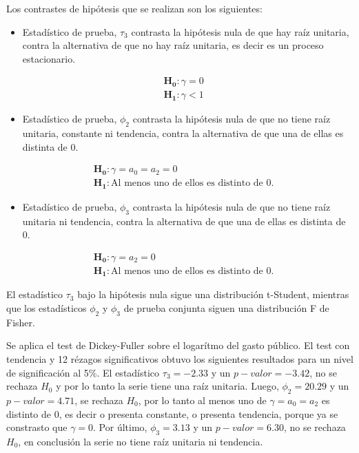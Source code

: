 \documentclass[
  12pt,
]{article}
\providecommand{\tightlist}{%
  \setlength{\itemsep}{0pt}\setlength{\parskip}{0pt}}
\begin{document}
Los contrastes de hipótesis que se realizan son los siguientes:

\begin{itemize}
\tightlist
\item
  Estadístico de prueba, \(\tau_3\) contrasta la hipótesis nula de que
  hay raíz unitaria, contra la alternativa de que no hay raíz unitaria,
  es decir es un proceso estacionario.
\end{itemize}

\begin{align*}
& \mathbf{H_0} : \gamma = 0 \\
& \mathbf{H_1} : \gamma < 1
\end{align*}

\begin{itemize}
\tightlist
\item
  Estadístico de prueba, \(\phi_2\) contrasta la hipótesis nula de que
  no tiene raíz unitaria, constante ni tendencia, contra la alternativa
  de que una de ellas es distinta de 0.
\end{itemize}

\begin{align*}
& \mathbf{H_0} : \gamma = a_0 = a_2 = 0 \\
& \mathbf{H_1} : \text{Al menos uno de ellos es distinto de 0.}
\end{align*}

\begin{itemize}
\tightlist
\item
  Estadístico de prueba, \(\phi_3\) contrasta la hipótesis nula de que
  no tiene raíz unitaria ni tendencia, contra la alternativa de que una
  de ellas es distinta de 0.
\end{itemize}

\begin{align*}
& \mathbf{H_0} : \gamma = a_2 = 0 \\
& \mathbf{H_1} : \text{Al menos uno de ellos es distinto de 0.}
\end{align*}

El estadístico \(\tau_3\) bajo la hipótesis nula sigue una distribución
t-Student, mientras que los estadísticos \(\phi_2\) y \(\phi_3\) de
prueba conjunta siguen una distribución F de Fisher.

Se aplica el test de Dickey-Fuller sobre el logarítmo del gasto público.
El test con tendencia y 12 rézagos significativos obtuvo los siguientes
resultados para un nivel de significación al 5\%. El estadístico \(
\tau_3 = -2.33\) y un \(p-valor=-3.42\), no se rechaza \(H_0\) y
por lo tanto la serie tiene una raíz unitaria. Luego, \(\phi_2 = 20.29\)
y un \(p-valor=4.71\), se rechaza \(H_0\), por lo tanto al menos uno de
\(\gamma = a_0 = a_2\) es distinto de 0, es decir o presenta
constante, o presenta tendencia, porque ya se constrasto que
\(\gamma = 0\). Por último, \(\phi_3 = 3.13\) y un \(p-valor=6.30\), no
se rechaza \(H_0\), en conclusión la serie no tiene raíz unitaria ni
tendencia.
\end{document}
